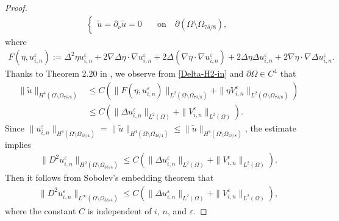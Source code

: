 \documentclass[12pt]{amsart}
\begin{document}
\begin{proof}
\begin{align*}
\begin{cases}
\tilde{u}= {\partial}_{\nu} \tilde{u}=0 \quad & \text{on} \quad {\partial} (\Omega \setminus \Omega_{7{\delta}/8}), 
\end{cases}
\end{align*}
where 
\begin{align*}
F(\eta,u^{\varepsilon}_{i,n}):= \Delta^{2} \eta u^{\varepsilon}_{i,n} + 2 \nabla \Delta \eta \cdot \nabla u^{\varepsilon}_{i,n} 
 + 2 \Delta (\nabla \eta \cdot \nabla u^{\varepsilon}_{i,n}) + 2 \Delta \eta \Delta u^{\varepsilon}_{i,n} 
 + 2 \nabla \eta \cdot \nabla \Delta u^{\varepsilon}_{i,n}.
\end{align*}
Thanks to Theorem 2.20 in \cite{GGS}, we observe from \eqref{Delta-H2-in} and ${\partial} \Omega \in C^{4}$ that  
\begin{align*}
\| \tilde{u} \|_{H^{4}(\Omega \setminus \Omega_{7 {\delta}/8})} 
& \le C (\|F(\eta,u^{\varepsilon}_{i,n}) \|_{L^{2}(\Omega \setminus \Omega_{7{\delta}/8})} 
          + \|\eta V^{\varepsilon}_{i,n} \|_{L^{2}(\Omega \setminus \Omega_{7{\delta}/8})}) \\
& \le C (\| \Delta u^{\varepsilon}_{i,n} \|_{L^{2}(\Omega)} + \| V^{\varepsilon}_{i,n} \|_{L^{2}(\Omega)}).           
\end{align*}
Since $\| u^{\varepsilon}_{i,n} \|_{H^{4}(\Omega \setminus \Omega_{3{\delta}/4})} = \| \tilde{u} \|_{H^{4}(\Omega \setminus \Omega_{3{\delta}/4})} 
\le \| \tilde{u} \|_{H^{4}(\Omega \setminus \Omega_{7 {\delta}/8})}$, the estimate implies 
\begin{align*}
\| D^{2} u^{\varepsilon}_{i,n} \|_{H^{2}(\Omega \setminus \Omega_{3{\delta}/4})} 
 \le C (\| \Delta u^{\varepsilon}_{i,n} \|_{L^{2}(\Omega)} + \| V^{\varepsilon}_{i,n} \|_{L^{2}(\Omega)}). 
\end{align*}
Then it follows from Sobolev's embedding theorem that 
\begin{align} \label{D2-uni-est-1}
\| D^{2} u^{\varepsilon}_{i,n} \|_{L^{\infty}(\Omega \setminus \Omega_{3 {\delta}/4})} 
 \le C ( \| \Delta u^{\varepsilon}_{i,n} \|_{L^{2}(\Omega)} + \| V^{\varepsilon}_{i,n} \|_{L^{2}(\Omega)}), 
\end{align}
where the constant $C$ is independent of $i$, $n$, and ${\varepsilon}$. 


\end{proof}
\end{document}
